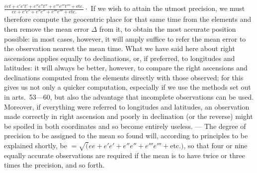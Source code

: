 $\frac{eet+e'e't'+e''e''t''+e'''e'''t'''+\text{etc.}}{ee+e'e'+e''e''+e'''e'''+\text{etc.}}\mathpunct{\cdot}$
If we wish to attain the utmost precision, we must therefore compute the geocentric place for that same time from the elements and then remove the mean error $\Delta$ from it, to obtain the most accurate position possible: in most cases, however, it will amply suffice to refer the mean error to the observation nearest the mean time. What we have said here about right ascensions applies equally to declinations, or, if preferred, to longitudes and latitudes: it will always be better, however, to compare the right ascensions and declinations computed from the elements directly with those observed; for this gives us not only a quicker computation, especially if we use the methods set out in arts.\ 53---60, but also the advantage that incomplete observations can be used. Moreover, if everything were referred to longitudes and latitudes, an observation made correctly in right ascension and poorly in declination (or the reverse) might be spoiled in both coordinates and so become entirely useless. --- The degree of precision to be assigned to the mean so found will, according to principles to be explained shortly, be $=\surd(ee+e'e'+e''e''+e'''e'''+\text{etc.})$, so that four or nine equally accurate observations are required if the mean is to have twice or three times the precision, and so forth.
